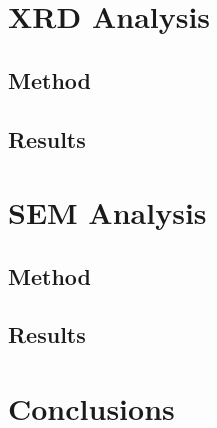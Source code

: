 \documentclass[twocolumn]{article}
\begin{document}
\begin{multicols}{2}
\section{XRD Analysis}

\label{sec:XRD}

\subsection{Method}

\subsection{Results}

\section{SEM Analysis}
\label{sec:SEM}

\subsection{Method}

\subsection{Results}

\section{Conclusions}

\printbibliography

\end{multicols}
\end{document}
